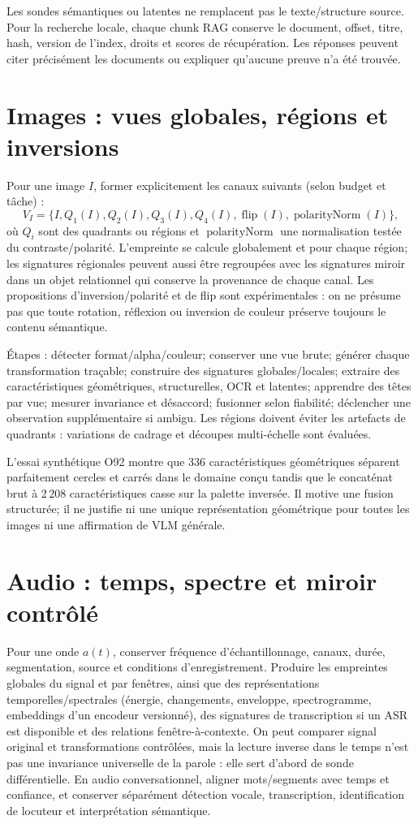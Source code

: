 \documentclass[11pt,a4paper]{report}
\begin{document}
Les sondes sémantiques ou latentes ne remplacent pas le texte/structure source. Pour la recherche locale, chaque chunk RAG conserve le document, offset, titre, hash, version de l'index, droits et scores de récupération. Les réponses peuvent citer précisément les documents ou expliquer qu'aucune preuve n'a été trouvée.

\section{Images : vues globales, régions et inversions}
Pour une image $I$, former explicitement les canaux suivants (selon budget et tâche) :
\[
 V_I=\{I, Q_1(I),Q_2(I),Q_3(I),Q_4(I),\operatorname{flip}(I),\operatorname{polarityNorm}(I)\},
\]
où $Q_i$ sont des quadrants ou régions et $\operatorname{polarityNorm}$ une normalisation testée du contraste/polarité. L'empreinte se calcule globalement et pour chaque région; les signatures régionales peuvent aussi être regroupées avec les signatures miroir dans un objet relationnel qui conserve la provenance de chaque canal. Les propositions d'inversion/polarité et de flip sont expérimentales : on ne présume pas que toute rotation, réflexion ou inversion de couleur préserve toujours le contenu sémantique.

Étapes : détecter format/alpha/couleur; conserver une vue brute; générer chaque transformation traçable; construire des signatures globales/locales; extraire des caractéristiques géométriques, structurelles, OCR et latentes; apprendre des têtes par vue; mesurer invariance et désaccord; fusionner selon fiabilité; déclencher une observation supplémentaire si ambigu. Les régions doivent éviter les artefacts de quadrants : variations de cadrage et découpes multi-échelle sont évaluées.

L'essai synthétique O92 montre que 336 caractéristiques géométriques séparent parfaitement cercles et carrés dans le domaine conçu tandis que le concaténat brut à 2\,208 caractéristiques casse sur la palette inversée. Il motive une fusion structurée; il ne justifie ni une unique représentation géométrique pour toutes les images ni une affirmation de VLM générale.

\section{Audio : temps, spectre et miroir contrôlé}
Pour une onde $a(t)$, conserver fréquence d'échantillonnage, canaux, durée, segmentation, source et conditions d'enregistrement. Produire les empreintes globales du signal et par fenêtres, ainsi que des représentations temporelles/spectrales (énergie, changements, enveloppe, spectrogramme, embeddings d'un encodeur versionné), des signatures de transcription si un ASR est disponible et des relations fenêtre-à-contexte. On peut comparer signal original et transformations contrôlées, mais la lecture inverse dans le temps n'est pas une invariance universelle de la parole : elle sert d'abord de sonde différentielle. En audio conversationnel, aligner mots/segments avec temps et confiance, et conserver séparément détection vocale, transcription, identification de locuteur et interprétation sémantique.
\end{document}

